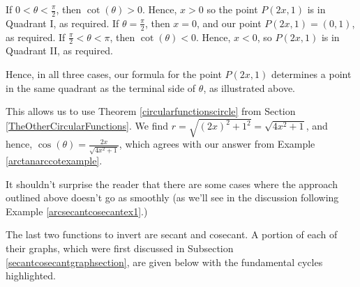 \documentclass{ximera}
\begin{document}
\smallskip

If $0 < \theta < \frac{\pi}{2}$, then $\cot(\theta) > 0$.  Hence, $x>0$ so the point $P(2x,1)$ is in Quadrant I, as required.  If $\theta = \frac{\pi}{2}$, then $x = 0$, and our point $P(2x,1) = (0,1)$, as required.  If $\frac{\pi}{2} < \theta < \pi$, then $\cot(\theta)<0$.  Hence, $x<0$, so $P(2x,1)$ is in Quadrant II, as required. 

\smallskip

Hence, in all three cases, our formula for the point $P(2x,1)$ determines a point in the same quadrant as the terminal side of $\theta$, as illustrated above.  

\smallskip

This allows us to use Theorem \ref{circularfunctionscircle} from Section \ref{TheOtherCircularFunctions}.  We find $r = \sqrt{(2x)^2+1^2} = \sqrt{4x^2+1}$, and hence,  $\cos(\theta) = \frac{2x}{\sqrt{4x^2+1}}$, which agrees with our answer from Example  \ref{arctanarccotexample}.

\smallskip

It shouldn't surprise the reader that there are some cases where the approach outlined above doesn't go as smoothly (as we'll see in the discussion following Example \ref{arcsecantcosecantex1}.)


\smallskip


The last two functions to invert are secant and cosecant.  A portion of each of their graphs, which were first discussed in Subsection \ref{secantcosecantgraphsection}, are given below with the fundamental cycles highlighted. 

\bigskip
\end{document}

